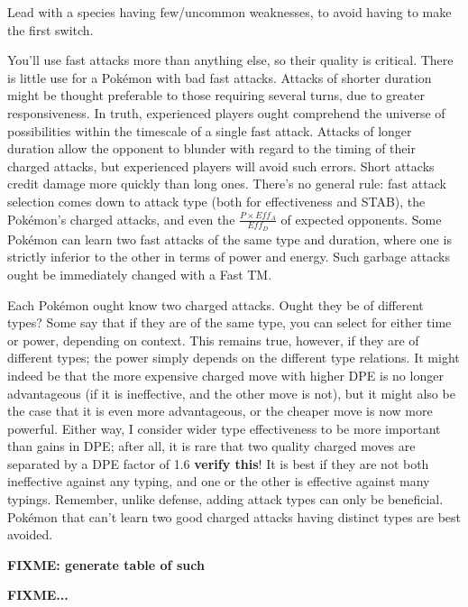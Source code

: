Lead with a species having few/uncommon weaknesses, to avoid having to make the first switch.

You'll use fast attacks more than anything else, so their quality is critical.
There is little use for a Pokémon with bad fast attacks.
Attacks of shorter duration might be thought preferable to those requiring
  several turns, due to greater responsiveness.
In truth, experienced players ought comprehend the universe of possibilities
  within the timescale of a single fast attack.
Attacks of longer duration allow the opponent to blunder with regard to the
  timing of their charged attacks, but experienced players will avoid
  such errors.
Short attacks credit damage more quickly than long ones.
There's no general rule: fast attack selection comes down to attack type
  (both for effectiveness and STAB), the Pokémon's charged attacks,
  and even the $\frac{P \times Eff_A}{Eff_D}$ of expected opponents.
Some Pokémon can learn two fast attacks of the same type and duration,
  where one is strictly inferior to the other in terms of power and
  energy.
Such garbage attacks ought be immediately changed with a Fast TM\@.

Each Pokémon ought know two charged attacks.
Ought they be of different types?
Some say that if they are of the same type, you can select for either time or power, depending on context.
This remains true, however, if they are of different types; the power simply depends on
  the different type relations.
It might indeed be that the more expensive charged move with higher DPE is no
  longer advantageous (if it is ineffective, and the other move is not),
  but it might also be the case that it is even more advantageous,
  or the cheaper move is now more powerful.
Either way, I consider wider type effectiveness to be more important than gains in DPE;
  after all, it is rare that two quality charged moves are separated by a DPE factor
  of 1.6 \textbf{verify this}!
It is best if they are not both ineffective against any typing, and one or the
  other is effective against many typings.
Remember, unlike defense, adding attack types can only be beneficial.
Pokémon that can't learn two good charged attacks having distinct types are best avoided.

  \textbf{FIXME: generate table of such}

\textbf{FIXME...}

